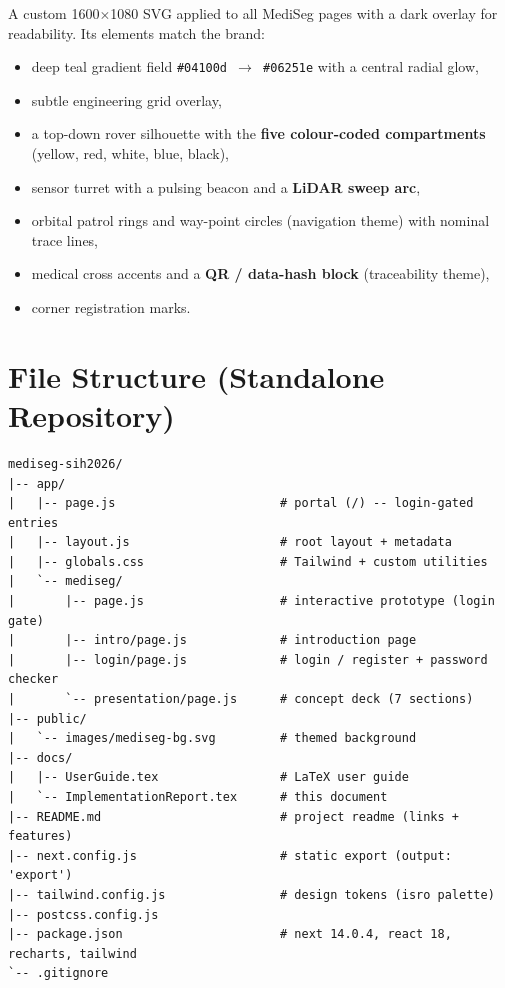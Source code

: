 \documentclass[11pt, a4paper]{article}
\begin{document}
A custom 1600$\times$1080 SVG applied to all MediSeg pages with a dark
overlay for readability. Its elements match the brand:

\begin{itemize}[leftmargin=1.6em, itemsep=2pt]
  \item deep teal gradient field \texttt{\#04100d $\rightarrow$ \#06251e} with a
        central radial glow,
  \item subtle engineering grid overlay,
  \item a top-down rover silhouette with the \textbf{five colour-coded
        compartments} (yellow, red, white, blue, black),
  \item sensor turret with a pulsing beacon and a \textbf{LiDAR sweep arc},
  \item orbital patrol rings and way-point circles
        (navigation theme) with nominal trace lines,
  \item medical cross accents and a \textbf{QR / data-hash block}
        (traceability theme),
  \item corner registration marks.
\end{itemize}

\section{File Structure (Standalone Repository)}

\begin{lstlisting}[style=cmd]
mediseg-sih2026/
|-- app/
|   |-- page.js                       # portal (/) -- login-gated entries
|   |-- layout.js                     # root layout + metadata
|   |-- globals.css                   # Tailwind + custom utilities
|   `-- mediseg/
|       |-- page.js                   # interactive prototype (login gate)
|       |-- intro/page.js             # introduction page
|       |-- login/page.js             # login / register + password checker
|       `-- presentation/page.js      # concept deck (7 sections)
|-- public/
|   `-- images/mediseg-bg.svg         # themed background
|-- docs/
|   |-- UserGuide.tex                 # LaTeX user guide
|   `-- ImplementationReport.tex      # this document
|-- README.md                         # project readme (links + features)
|-- next.config.js                    # static export (output: 'export')
|-- tailwind.config.js                # design tokens (isro palette)
|-- postcss.config.js
|-- package.json                      # next 14.0.4, react 18, recharts, tailwind
`-- .gitignore
\end{lstlisting}
\end{document}
